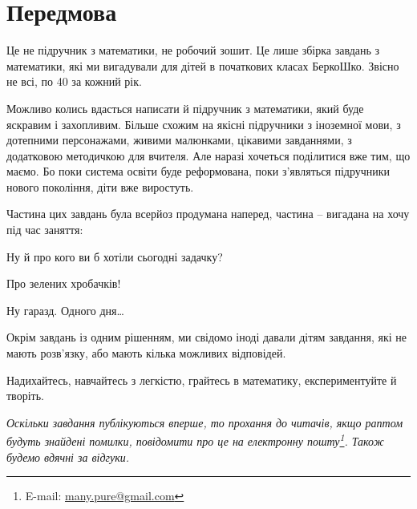 \chapter*{Передмова}

Це не підручник з математики, не робочий зошит.
Це лише збірка завдань з математики, які ми вигадували для дітей
в початкових класах БеркоШко.
Звісно не всі, по 40 за кожний рік.

Можливо колись вдасться написати й підручник з математики,
який буде яскравим і захопливим.
Більше схожим на якісні підручники з іноземної мови, з дотепними персонажами,
живими малюнками, цікавими завданнями, з додатковою методичкою для вчителя.
Але наразі хочеться поділитися вже тим, що маємо.
Бо поки система освіти буде реформована, поки з’являться підручники
нового покоління, діти вже виростуть.

Частина цих завдань була всерйоз продумана наперед,
частина – вигадана на хочу під час заняття:
\begin{dialogue}
    \item Ну й про кого ви б хотіли сьогодні задачку?
    \item Про зелених хробачків!
    \item Ну гаразд. Одного дня\ldots
\end{dialogue}

Окрім завдань із одним рішенням, ми свідомо іноді давали дітям завдання,
які не мають розв’язку, або мають кілька можливих відповідей.

Надихайтесь, навчайтесь з легкістю, грайтесь в математику,
експериментуйте й творіть. \smiley

\medskip
\medskip

\emph{\small
Оскільки завдання публікуються вперше, то прохання до читачів,
якщо раптом будуть знайдені помилки,
повідомити про це на електронну пошту\footnote{
    E-mail: \url{many.pure@gmail.com}
}. Також будемо вдячні за відгуки.
}%
\smiley
